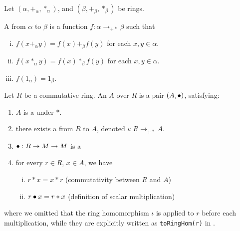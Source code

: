 
\begin{definition}
    \label{RingHom}
    \leanok

    Let $(\alpha, +_\alpha, *_\alpha)$, and $(\beta, +_\beta, *_\beta)$ be rings.
    
    A  from $\alpha$ to $\beta$ is a function $f : \alpha \to_{+*} \beta$ such that

    \begin{enumerate}[(i)]
        \item $f(x +_{\alpha} y) = f(x) +_{\beta} f(y)$ for each $x,y \in \alpha$.
        \item $f(x *_{\alpha} y) = f(x) *_{\beta} f(y)$ for each $x,y \in \alpha$.
        \item $f(1_{\alpha}) = 1_{\beta}$.
    \end{enumerate}

\end{definition}

\begin{definition}[Algebra]
    \label{Algebra}
    \leanok

    Let $R$ be a commutative ring. An  $A$ over $R$ is a pair $(A, \bullet)$, satisfying:

    \begin{enumerate}
    \item $A$ is a  under $*$.
    
    \item there exists a  from $R$ to $A$, denoted $\iota : R \to_{+*} A$.
    
    \item $\bullet : R \to M \to M$ is a 
    
    \item for every $r \in R$, $x \in A$, we have

    \begin{enumerate}[(i)]
        \item $r * x = x * r$ (commutativity between $R$ and $A$)
        \item $r \bullet x = r * x$ (definition of scalar multiplication)
    \end{enumerate}

    \end{enumerate}

    where we omitted that the ring homomorphism $\iota$ is applied to $r$ before each multiplication,
    while they are explicitly written as \lstinline|toRingHom(r)| in \Mathlib.

\end{definition}

